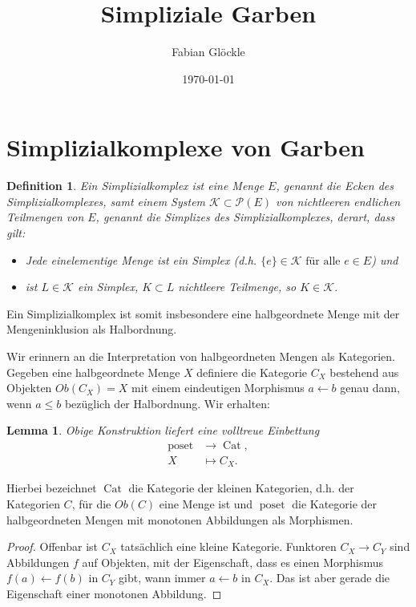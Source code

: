 \documentclass[a4paper]{article}
\newtheorem{lemma}[theorem]{Lemma}
\newtheorem{defn}[theorem]{Definition}
\DeclareMathOperator{\Cat}{Cat}
\DeclareMathOperator{\poset}{poset}
\begin{document}
\title{Simpliziale Garben}
\author{Fabian Glöckle}
\date{\today}

\section{Simplizialkomplexe von Garben}

\begin{defn}
  Ein Simplizialkomplex ist eine Menge $E$, genannt die Ecken des
  Simplizialkomplexes, samt einem System $ \mathcal{K} \subset
  \mathcal{P}(E) $ von nichtleeren endlichen Teilmengen von $E$,
  genannt die Simplizes des Simplizialkomplexes, derart, dass gilt:
  \begin{itemize}
  \item Jede einelementige Menge ist ein Simplex (d.h. $\{e\} \in
    \mathcal{K} \text{ für alle } e \in E$) und
  \item ist $L \in \mathcal{K}$ ein Simplex, $K \subset L$ nichtleere
    Teilmenge, so $K \in \mathcal{K}$.
  \end{itemize}
\end{defn}

Ein Simplizialkomplex ist somit insbesondere eine halbgeordnete Menge
mit der Mengeninklusion als Halbordnung.

Wir erinnern an die Interpretation von halbgeordneten Mengen als
Kategorien. Gegeben eine halbgeordnete Menge $X$ definiere die
Kategorie $C_X$ bestehend aus Objekten $Ob(C_X) = X$ mit einem
eindeutigen Morphismus $a \leftarrow b$ genau dann, wenn $a \leq b$ bezüglich
der Halbordnung. Wir erhalten:

\begin{lemma}
  Obige Konstruktion liefert eine volltreue Einbettung
  \begin{align*}
    \poset &\to \Cat, \\
    X &\mapsto C_X.    
  \end{align*}
\end{lemma}


Hierbei bezeichnet $\Cat$ die Kategorie der kleinen Kategorien,
d.h. der Kategorien $C$, für die $Ob(C)$ eine Menge ist und $\poset$
die Kategorie der halbgeordneten Mengen mit monotonen Abbildungen als
Morphismen.

\begin{proof}
  Offenbar ist $C_X$ tatsächlich eine kleine Kategorie. Funktoren $C_X
  \to C_Y$ sind Abbildungen $f$ auf Objekten, mit der Eigenschaft,
  dass es einen Morphismus $f(a) \leftarrow f(b)$ in $C_Y$ gibt, wann immer
  $a \leftarrow b$ in $C_X$. Das ist aber gerade die Eigenschaft einer
  monotonen Abbildung.
\end{proof}
\end{document}
